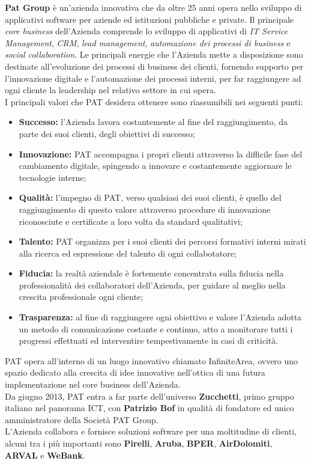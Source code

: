 \textbf{Pat Group} è un'azienda innovativa che da oltre 25 anni opera nello sviluppo di applicativi software per aziende ed istituzioni pubbliche e private. Il principale \textit{core business} dell'Azienda comprende lo sviluppo di applicativi di \textit{IT Service Management}, \textit{CRM}, \textit{lead management}, \textit{automazione dei processi di business} e \textit{social collaboration}.
Le principali energie che l'Azienda mette a disposizione sono destinate all'evoluzione dei processi di business dei clienti, fornendo supporto per l'innovazione digitale e l'automazione dei processi interni, per far raggiungere ad ogni cliente la leadership nel relativo settore in cui opera.\\
I principali valori che PAT desidera ottenere sono riassumibili nei seguenti punti:
\begin{itemize}
	\item \textbf{Successo:} l'Azienda lavora costantemente al fine del raggiungimento, da parte dei suoi clienti, degli obiettivi di successo;
	\item \textbf{Innovazione:} PAT accompagna i propri clienti attraverso la difficile fase del cambiamento digitale, spingendo a innovare e costantemente aggiornare le tecnologie interne;
	\item \textbf{Qualità:} l'impegno di PAT, verso qualsiasi dei suoi clienti, è quello del raggiungimento di questo valore attraverso procedure di innovazione riconosciute e certificate a loro volta da standard qualitativi;
	\item \textbf{Talento:} PAT organizza per i suoi clienti dei percorsi formativi interni mirati alla ricerca ed espressione del talento di ogni collabotatore;
	\item \textbf{Fiducia:} la realtà aziendale è fortemente concentrata sulla fiducia nella professionalità dei collaboratori dell'Azienda, per guidare al meglio nella crescita professionale ogni cliente;
	\newpage
	\item \textbf{Trasparenza:} al fine di raggiungere ogni obiettivo e valore l'Azienda adotta un metodo di comunicazione costante e continuo, atto a monitorare tutti i progressi effettuati ed interventire tempestivamente in casi di criticità.
\end{itemize}
PAT opera all'interno di un luogo innovativo chiamato InfiniteArea, ovvero uno spazio dedicato alla crescita di idee innovative nell'ottica di una futura implementazione nel core business dell'Azienda. \\
Da giugno 2013, PAT entra a far parte dell'universo \textbf{Zucchetti}, primo gruppo italiano nel panorama ICT, con \textbf{Patrizio Bof} in qualità di fondatore ed unico amministratore della Società PAT Group.\\
L'Azienda collabora e fornisce soluzioni software per una moltitudine di clienti, alcuni tra i più importanti sono \textbf{Pirelli}, \textbf{Aruba}, \textbf{BPER}, \textbf{AirDolomiti}, \textbf{ARVAL} e \textbf{WeBank}.
